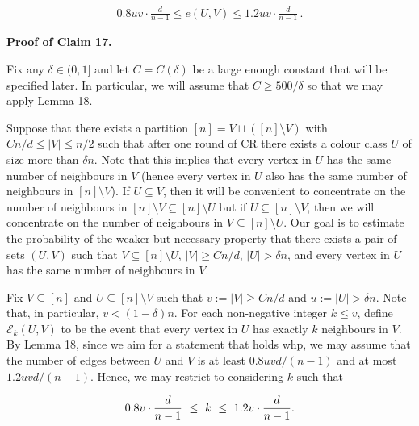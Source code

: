 \[\begin{gathered}
0.8uv\cdot\frac{d}{n-1}\leq e(U,V)\leq 1.2uv\cdot\frac{d}{n-1}\,.
\end{gathered}\]







\par\medskip\noindent\textbf{
\textbf{Proof of Claim 17}.}\par




Fix any $\delta\in(0,1]$ and let $C=C(\delta)$ be a large enough constant that will be specified later. In particular, we will assume that $C\geq 500/\delta$ so that we may apply Lemma 18.\par




Suppose that there exists a partition $[n]=V\sqcup([n]\setminus V)$ with $Cn/d\leq|V|\leq n/2$ such that after one round of CR there exists a colour class $U$ of size more than $\delta n$. Note that this implies that every vertex in $U$ has the same number of neighbours in $V$ (hence every vertex in $U$ also has the same number of neighbours in $[n]\setminus V$). If $U\subseteq V$, then it will be convenient to concentrate on the number of neighbours in $[n]\setminus V\subseteq[n]\setminus U$ but if $U\subseteq[n]\setminus V$, then we will concentrate on the number of neighbours in $V\subseteq[n]\setminus U$. Our goal is to estimate the probability of the weaker but necessary property that there exists a pair of sets $(U,V)$ such that $V\subseteq[n]\setminus U$, $|V|\geq Cn/d$, $|U|>\delta n$, and every vertex in $U$ has the same number of neighbours in $V$.\par




Fix $V\subseteq[n]$ and $U\subseteq[n]\setminus V$ such that $v:=|V|\geq Cn/d$ and $u:=|U|>\delta n$. Note that, in particular, $v<(1-\delta)n$. For each non-negative integer $k\leq v$, define $\mathcal{E}_{k}(U,V)$ to be the event that every vertex in $U$ has exactly $k$ neighbours in $V$. By Lemma 18, since we aim for a statement that holds whp, we may assume that the number of edges between $U$ and $V$ is at least $0.8uvd/(n-1)$ and at most $1.2uvd/(n-1)$. Hence, we may restrict to considering $k$ such that\par


\[\begin{gathered}
0.8v\cdot\frac{d}{n-1}\nobreak\ \leq\nobreak\ k\nobreak\ \leq\nobreak\ 1.2v\cdot\frac{d}{n-1}.
\end{gathered}\]




